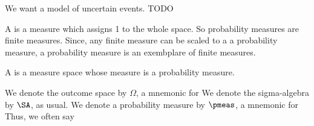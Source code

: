 
\sbasic



\sstart



We want a model
of uncertain events.
TODO


A
is a measure
which assigns
1 to the whole space.
So probability measures
are finite measures.
Since, any finite measure
can be scaled to a
a probability measure,
a probability measure
is an exembplare of
finite measures.

A
is a measure space
whose measure is a
probability measure.


We denote the
outcome space by
$\Omega$,
a mnemonic for
We denote the
sigma-algebra by
$\SA$,
as usual.
We denote a probability
measure
by $\pmeas$, a mnemonic
for 
Thus, we often say


\strats
